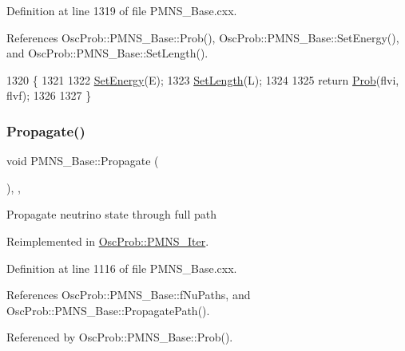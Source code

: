 Definition at line 1319 of file P\+M\+N\+S\+\_\+\+Base.\+cxx.



References Osc\+Prob\+::\+P\+M\+N\+S\+\_\+\+Base\+::\+Prob(), Osc\+Prob\+::\+P\+M\+N\+S\+\_\+\+Base\+::\+Set\+Energy(), and Osc\+Prob\+::\+P\+M\+N\+S\+\_\+\+Base\+::\+Set\+Length().


\begin{DoxyCode}
1320 \{
1321 
1322   \hyperlink{classOscProb_1_1PMNS__Base_a95b3b0d0cab5e6a54b5ef99587f837c0}{SetEnergy}(E);
1323   \hyperlink{classOscProb_1_1PMNS__Base_a6241325b1bd28cafa556daaecbe4ed62}{SetLength}(L);
1324 
1325   \textcolor{keywordflow}{return} \hyperlink{classOscProb_1_1PMNS__Base_aa2e10704d2d205a1ec8988de14b1a66f}{Prob}(flvi, flvf);
1326 
1327 \}
\end{DoxyCode}
\mbox{\label{classOscProb_1_1PMNS__Base_a054e3a8b05b9a958b6fa416e4a835e3e}} 
\subsubsection{\texorpdfstring{Propagate()}{Propagate()}}
{\footnotesize\ttfamily void P\+M\+N\+S\+\_\+\+Base\+::\+Propagate (\begin{DoxyParamCaption}{ }\end{DoxyParamCaption})\hspace{0.3cm}{\ttfamily [protected]}, {\ttfamily [virtual]}, {\ttfamily [inherited]}}

Propagate neutrino state through full path 

Reimplemented in \hyperlink{classOscProb_1_1PMNS__Iter_a821845214fc7a3a737fd69c6fb32dd1f}{Osc\+Prob\+::\+P\+M\+N\+S\+\_\+\+Iter}.



Definition at line 1116 of file P\+M\+N\+S\+\_\+\+Base.\+cxx.



References Osc\+Prob\+::\+P\+M\+N\+S\+\_\+\+Base\+::f\+Nu\+Paths, and Osc\+Prob\+::\+P\+M\+N\+S\+\_\+\+Base\+::\+Propagate\+Path().



Referenced by Osc\+Prob\+::\+P\+M\+N\+S\+\_\+\+Base\+::\+Prob().


